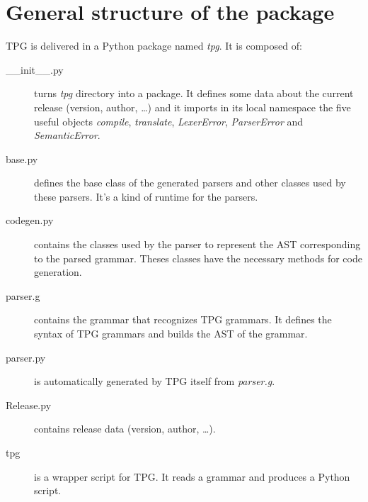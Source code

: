 \section{General structure of the package}

TPG is delivered in a Python package named \emph{tpg}.
It is composed of:

\begin{description}
	\item [\_\_init\_\_.py]
		turns \emph{tpg} directory into a package.
		It defines some data about the current release (version, author, \ldots) and it imports in its local namespace the five useful objects \emph{compile}, \emph{translate}, \emph{LexerError}, \emph{ParserError} and \emph{SemanticError}.
	\item [base.py]
		defines the base class of the generated parsers and other classes used by these parsers. It's a kind of runtime for the parsers.
	\item [codegen.py]
		contains the classes used by the parser to represent the AST corresponding to the parsed grammar. Theses classes have the necessary methods for code generation.
	\item [parser.g]
		contains the grammar that recognizes TPG grammars. It defines the syntax of TPG grammars and builds the AST of the grammar.
	\item [parser.py]
		is automatically generated by TPG itself from \emph{parser.g}.
	\item [Release.py]
		contains release data (version, author, \ldots).
	\item [tpg]
		is a wrapper script for TPG.
		It reads a grammar and produces a Python script.
\end{description}
